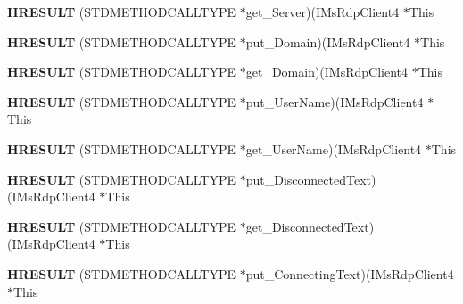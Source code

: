 \begin{DoxyCompactItemize}
\item 
\mbox{\label{struct_i_ms_rdp_client4_vtbl_af45d7f1aea88a874ebcb9b264478d1af}} 
{\bfseries H\+R\+E\+S\+U\+LT} (S\+T\+D\+M\+E\+T\+H\+O\+D\+C\+A\+L\+L\+T\+Y\+PE $\ast$get\+\_\+\+Server)(I\+Ms\+Rdp\+Client4 $\ast$This
\item 
\mbox{\label{struct_i_ms_rdp_client4_vtbl_ac4083374db63daa0e2e5a6b3e99e4ead}} 
{\bfseries H\+R\+E\+S\+U\+LT} (S\+T\+D\+M\+E\+T\+H\+O\+D\+C\+A\+L\+L\+T\+Y\+PE $\ast$put\+\_\+\+Domain)(I\+Ms\+Rdp\+Client4 $\ast$This
\item 
\mbox{\label{struct_i_ms_rdp_client4_vtbl_a71e895609379b0856864af17e96296cb}} 
{\bfseries H\+R\+E\+S\+U\+LT} (S\+T\+D\+M\+E\+T\+H\+O\+D\+C\+A\+L\+L\+T\+Y\+PE $\ast$get\+\_\+\+Domain)(I\+Ms\+Rdp\+Client4 $\ast$This
\item 
\mbox{\label{struct_i_ms_rdp_client4_vtbl_a2ab53362d660bbcf3670e6b2f21f4d7e}} 
{\bfseries H\+R\+E\+S\+U\+LT} (S\+T\+D\+M\+E\+T\+H\+O\+D\+C\+A\+L\+L\+T\+Y\+PE $\ast$put\+\_\+\+User\+Name)(I\+Ms\+Rdp\+Client4 $\ast$This
\item 
\mbox{\label{struct_i_ms_rdp_client4_vtbl_af84eb421d0b2138248a046960cd4bde7}} 
{\bfseries H\+R\+E\+S\+U\+LT} (S\+T\+D\+M\+E\+T\+H\+O\+D\+C\+A\+L\+L\+T\+Y\+PE $\ast$get\+\_\+\+User\+Name)(I\+Ms\+Rdp\+Client4 $\ast$This
\item 
\mbox{\label{struct_i_ms_rdp_client4_vtbl_aab3ef23b756d8821be36ae59bf4f9d59}} 
{\bfseries H\+R\+E\+S\+U\+LT} (S\+T\+D\+M\+E\+T\+H\+O\+D\+C\+A\+L\+L\+T\+Y\+PE $\ast$put\+\_\+\+Disconnected\+Text)(I\+Ms\+Rdp\+Client4 $\ast$This
\item 
\mbox{\label{struct_i_ms_rdp_client4_vtbl_ac1c17018caf9175eb4a0baabe97189e7}} 
{\bfseries H\+R\+E\+S\+U\+LT} (S\+T\+D\+M\+E\+T\+H\+O\+D\+C\+A\+L\+L\+T\+Y\+PE $\ast$get\+\_\+\+Disconnected\+Text)(I\+Ms\+Rdp\+Client4 $\ast$This
\item 
\mbox{\label{struct_i_ms_rdp_client4_vtbl_ac257f829c7fc612041049b558f0b5009}} 
{\bfseries H\+R\+E\+S\+U\+LT} (S\+T\+D\+M\+E\+T\+H\+O\+D\+C\+A\+L\+L\+T\+Y\+PE $\ast$put\+\_\+\+Connecting\+Text)(I\+Ms\+Rdp\+Client4 $\ast$This

\end{DoxyCompactItemize}
